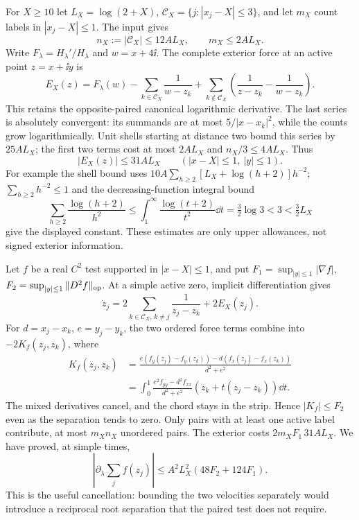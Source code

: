 For $X\ge10$ let $L_X=\log(2+X)$,
$\mathcal C_X=\{j:|x_j-X|\le3\}$, and let $m_X$ count labels in
$|x_j-X|\le1$. The input gives
\[
 n_X:=|\mathcal C_X|\le12AL_X,\qquad m_X\le2AL_X.
\]
Write $F_\lambda=H_\lambda'/H_\lambda$ and $w=x+4\ii$.
The complete exterior force at an active point $z=x+\ii y$ is
\begin{equation}\label{eq:exterior-force}
 E_X(z)=F_\lambda(w)-\sum_{k\in\mathcal C_X}\frac1{w-z_k}
  +\sum_{k\notin\mathcal C_X}
       \left(\frac1{z-z_k}-\frac1{w-z_k}\right).
\end{equation}
This retains the opposite-paired canonical logarithmic derivative.
The last series is absolutely convergent: its summands are at most
$5/|x-x_k|^2$, while the counts grow logarithmically. Unit shells
starting at distance two bound this series by $25AL_X$; the first
two terms cost at most $2AL_X$ and $n_X/3\le4AL_X$. Thus
\begin{equation}\label{eq:exterior-bound}
 |E_X(z)|\le31AL_X\qquad(|x-X|\le1,\ |y|\le1).
\end{equation}
For example the shell bound uses
$10A\sum_{h\ge2}[L_X+\log(h+2)]h^{-2}$;
$\sum_{h\ge2}h^{-2}\le1$ and the decreasing-function integral bound
\[
 \sum_{h\ge2}\frac{\log(h+2)}{h^2}
 \le\int_1^\infty\frac{\log(t+2)}{t^2}\dd t
 =\tfrac32\log3<3<\tfrac32L_X
\]
give the displayed constant. These estimates are only upper
allowances, not signed exterior information.

Let $f$ be a real $C^2$ test supported in $|x-X|\le1$, and put
$F_1=\sup_{|y|\le1}|\nabla f|$,
$F_2=\sup_{|y|\le1}\|D^2f\|_{\rm op}$. At a simple active zero,
implicit differentiation gives
\[
 \dot z_j=2\sum_{k\in\mathcal C_X,\,k\ne j}\frac1{z_j-z_k}
                  +2E_X(z_j).
\]
For $d=x_j-x_k$, $e=y_j-y_k$, the two ordered force terms combine
into $-2K_f(z_j,z_k)$, where
\begin{align}
 K_f(z_j,z_k)
  &=\frac{e(f_y(z_j)-f_y(z_k))-d(f_x(z_j)-f_x(z_k))}{d^2+e^2}\nonumber\\
  &=\int_0^1\frac{e^2 f_{yy}-d^2 f_{xx}}{d^2+e^2}
                     (z_k+t(z_j-z_k))\dd t.\label{eq:chord-cancellation}
\end{align}
The mixed derivatives cancel, and the chord stays in the strip.
Hence $|K_f|\le F_2$ even as the separation tends to zero.
Only pairs with at least one active label contribute, at most
$m_Xn_X$ unordered pairs. The exterior costs $2m_XF_1\,31AL_X$.
We have proved, at simple times,
\begin{equation}\label{eq:compact-time-test}
 \left|\partial_\lambda\sum_j f(z_j)\right|
       \le A^2L_X^2(48F_2+124F_1).
\end{equation}
This is the useful cancellation: bounding the two velocities separately
would introduce a reciprocal root separation that the paired test does
not require.

